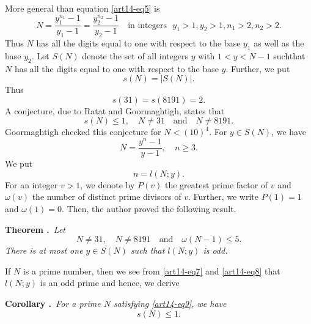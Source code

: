 More general than equation \eqref{art14-eq5} is 
$$
N=\dfrac{y^{n_{1}}_{1}-1}{y_{1}-1}=\dfrac{y^{n_{2}}_{2}-1}{y_{2}-1}\quad\text{in integers~ } y_{1}>1, y_{2}>1, n_{1}>2,n_{2}>2.
$$
Thus $N$ has all the digits equal to one with respect to the base $y_{1}$ as well as the base $y_{2}$. Let $S(N)$ denote the set of all integers $y$ with $1<y<N-1$ such\pageoriginale that $N$ has all the digits equal to one with respect to the base $y$. Further, we put
$$
s(N)=|S(N)|.
$$
Thus
$$
s(31)=s(8191)=2.
$$
A conjecture, due to Ratat and Goormaghtigh, states that
\begin{equation}
s(N)\leq 1,\quad N\neq 31\text{~~ and~~ } N\neq 8191.\label{art14-eq6}
\end{equation}
Goormaghtigh \cite{art14-key11} checked this conjecture for $N<(10)^{4}$. For $y\in S(N)$, we have
\begin{equation}
N=\dfrac{y^{n}-1}{y-1},\quad n\geq 3.\label{art14-eq7}
\end{equation}
We put
\begin{equation}
n=l(N; y).\label{art14-eq8}
\end{equation}
For an integer $v>1$, we denote by $P(v)$ the greatest prime factor of $v$ and $\omega(v)$ the number of distinct prime divisors of $v$. Further, we write $P(1)=1$ and $\omega(1)=0$. Then, the author \cite{art14-key29} proved the following result.

\medskip
\noindent
{\bf Theorem .\label{art14-thm1}}~{\em Let}
\begin{equation}
N\neq 31,\quad N\neq 8191\text{~~ and~~ } \omega(N-1)\leq 5.\label{art14-eq9}
\end{equation}
{\em There is at most one $y\in S(N)$ such that $l(N;y)$ is odd.}

If $N$ is a prime number, then we see from \eqref{art14-eq7} and \eqref{art14-eq8} that $l(N;y)$ is an odd prime and hence, we derive

\medskip
\noindent
{\bf Corollary .\label{art14-coro1}}~{\em For a prime $N$ satisfying \eqref{art14-eq9}, we have}
$$
s(N)\leq 1.
$$

